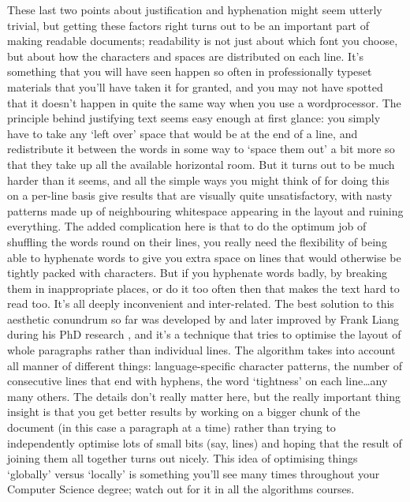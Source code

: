 These last two points about justification and hyphenation might seem utterly trivial, but getting these factors right turns out to be an important part of making readable documents; readability is not just about which font you choose, but about how the characters and spaces are distributed on each line. It's something that you will have seen happen so often in professionally typeset materials that you'll have taken it for granted, and you may not have spotted that it doesn't happen in quite the same way when you use a wordprocessor. The principle behind justifying text seems easy enough at first glance: you simply have to take any `left over' space that would be at the end of a line, and redistribute it between the words in some way to `space them out' a bit more so that they take up all the available horizontal room. But it turns out to be much harder than it seems, and all the simple ways you might think of for doing this on a per-line basis give results that are visually quite unsatisfactory, with nasty patterns made up of neighbouring whitespace appearing in the layout and ruining everything. The added complication here is that to do the optimum job of shuffling the words round on their lines, you really need the flexibility of being able to hyphenate words to give you extra space on lines that would otherwise be tightly packed with characters. But if you hyphenate words badly, by breaking them in inappropriate places, or do it too often then that makes the text hard to read too. It's all deeply inconvenient and inter-related. The best solution to this aesthetic conundrum so far was developed by \cite{SPE:SPE4380111102} and later improved by Frank Liang during his PhD research \citep{liang}, and it's a technique that tries to optimise the layout of whole paragraphs rather than individual lines. The algorithm takes into account all manner of different things: language-specific character patterns, the number of consecutive lines that end with hyphens, the word `tightness' on each line\ldots any many others. The details don't really matter here, but the really important thing insight is that you get better results by working on a bigger chunk of the document (in this case a paragraph at a time) rather than trying to independently optimise lots of small bits (say, lines) and hoping that the result of joining them all together turns out nicely. This idea of optimising things `globally' versus `locally' is something you'll see many times throughout your Computer Science degree; watch out for it in all the algorithms courses.

